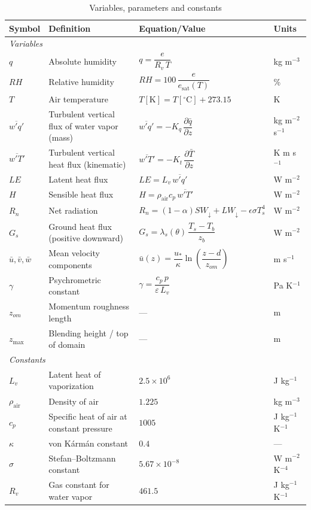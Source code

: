 \documentclass{article}
\begin{document}
    \begin{table}[t]
    \renewcommand{\arraystretch}{1.35} 
    \caption{Variables, parameters and constants}
    \centering
    \begin{tabular}{l p{6.0cm} p{5.2cm} l}
    \hline
    \textbf{Symbol} & \textbf{Definition} & \textbf{Equation/Value} & \textbf{Units} \\
    \hline
    \multicolumn{4}{l}{\textit{Variables}}\\
    \hline
    $q$ & Absolute humidity &
    $q=\dfrac{e}{R_v\,T}$ &
    kg m$^{-3}$ \\
    $RH$ & Relative humidity &
    $RH=100\,\dfrac{e}{e_{\mathrm{sat}}(T)}$ &
    \% \\
    $T$ & Air temperature &
    $T[\mathrm{K}]=T[^\circ\mathrm{C}]+273.15$ &
    K \\
    $\overline{w'q'}$ & Turbulent vertical flux of water vapor (mass) &
    $\overline{w'q'}=-K_q\,\dfrac{\partial \bar q}{\partial z}$ &
    kg m$^{-2}$ s$^{-1}$ \\
    $\overline{w'T'}$ & Turbulent vertical heat flux (kinematic) &
    $\overline{w'T'}=-K_t\,\dfrac{\partial \bar T}{\partial z}$ &
    K m s$^{-1}$ \\
    $LE$ & Latent heat flux &
    $LE=L_v\,\overline{w'q'}$ &
    W m$^{-2}$ \\
    $H$ & Sensible heat flux &
    $H=\rho_{\mathrm{air}} c_p\,\overline{w'T'}$ &
    W m$^{-2}$ \\
    $R_n$ & Net radiation &
    $R_n=(1-\alpha)SW_{\downarrow}+LW_{\downarrow}-\epsilon\sigma T_s^{4}$ &
    W m$^{-2}$ \\
    $G_s$ & Ground heat flux (positive downward) &
    $G_s=\lambda_s(\theta)\,\dfrac{T_s-T_b}{z_b}$ &
    W m$^{-2}$ \\
    $\bar u,\bar v,\bar w$ & Mean velocity components &
    $\bar u(z)=\dfrac{u_*}{\kappa}\ln\!\left(\dfrac{z-d}{z_{om}}\right)$ &
    m s$^{-1}$ \\
    $\gamma$ & Psychrometric constant & $\gamma = \dfrac{c_p\,p}{\varepsilon\,L_v}$ & Pa K$^{-1}$ \\
    $z_{om}$ & Momentum roughness length & --- & m \\
    $z_{\max}$& Blending height / top of domain & --- & m \\
    \hline
    \multicolumn{4}{l}{\textit{Constants}}\\
    \hline
    $L_v$ & Latent heat of vaporization & $2.5\times 10^{6}$ & J kg$^{-1}$ \\
    $\rho_{\mathrm{air}}$ & Density of air & $1.225$ & kg m$^{-3}$ \\
    $c_p$ & Specific heat of air at constant pressure & $1005$ & J kg$^{-1}$ K$^{-1}$ \\
    $\kappa$ & von K\'arm\'an constant & $0.4$ & --- \\
    $\sigma$ & Stefan--Boltzmann constant & $5.67\times 10^{-8}$ & W m$^{-2}$ K$^{-4}$ \\
    $R_v$ & Gas constant for water vapor & $461.5$ & J kg$^{-1}$ K$^{-1}$ \\
    \hline
    \end{tabular}
    \end{table}
\end{document}

